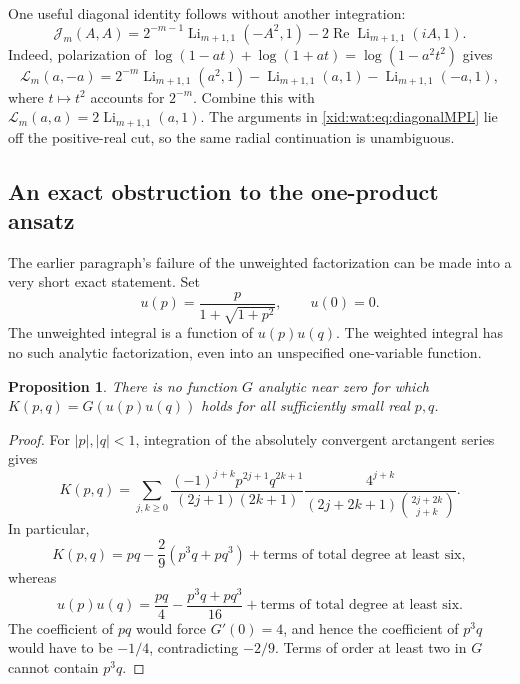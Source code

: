 \documentclass[11pt,a4paper]{article}
\numberwithin{equation}{section}
\newtheorem{proposition}[theorem]{Proposition}
\theoremstyle{definition}
\theoremstyle{remark}
\begin{document}
One useful diagonal identity follows without another integration:
\begin{equation}\label{xid:wat:eq:diagonalMPL}
 \mathcal J_m(A,A)
 =2^{-m-1}\operatorname{Li}_{m+1,1}(-A^2,1)
   -2\operatorname{Re}\operatorname{Li}_{m+1,1}(iA,1).
\end{equation}
Indeed, polarization of
$\log(1-at)+\log(1+at)=\log(1-a^2t^2)$ gives
\[
 \mathcal L_m(a,-a)
 =2^{-m}\operatorname{Li}_{m+1,1}(a^2,1)
   -\operatorname{Li}_{m+1,1}(a,1)
   -\operatorname{Li}_{m+1,1}(-a,1),
\]
where $t\mapsto t^2$ accounts for $2^{-m}$. Combine this with
$\mathcal L_m(a,a)=2\operatorname{Li}_{m+1,1}(a,1)$.
The arguments in \eqref{xid:wat:eq:diagonalMPL} lie off the positive-real
cut, so the same radial continuation is unambiguous.

\subsection{An exact obstruction to the one-product ansatz}

The earlier paragraph's failure of the unweighted factorization can
be made into a very short exact statement. Set
\[
 u(p)=\frac{p}{1+\sqrt{1+p^2}},\qquad u(0)=0.
\]
The unweighted integral is a function of $u(p)u(q)$. The weighted
integral has no such analytic factorization, even into an unspecified
one-variable function.

\begin{proposition}\label{xid:wat:prop:nonfactor}
There is no function $G$ analytic near zero for which
$K(p,q)=G(u(p)u(q))$ holds for all sufficiently small real $p,q$.
\end{proposition}

\begin{proof}
For $|p|,|q|<1$, integration of the absolutely convergent arctangent
series gives
\begin{equation}\label{xid:wat:eq:doubleTaylor}
 K(p,q)=\sum_{j,k\geq0}
 \frac{(-1)^{j+k}p^{2j+1}q^{2k+1}}{(2j+1)(2k+1)}
 \frac{4^{j+k}}{(2j+2k+1)\binom{2j+2k}{j+k}}.
\end{equation}
In particular,
\[
 K(p,q)=pq-\frac29(p^3q+pq^3)
       +\text{terms of total degree at least six},
\]
whereas
\[
 u(p)u(q)=\frac{pq}{4}-\frac{p^3q+pq^3}{16}
       +\text{terms of total degree at least six}.
\]
The coefficient of $pq$ would force $G'(0)=4$, and hence the
coefficient of $p^3q$ would have to be $-1/4$, contradicting $-2/9$.
Terms of order at least two in $G$ cannot contain $p^3q$.
\end{proof}
\end{document}
